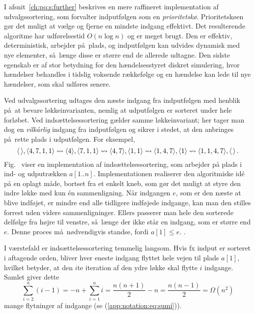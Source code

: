 I afsnit~\ref{ch:pq:s:further}
beskrives en mere raffineret implementation af udvalgssortering, som forvalter indputfølgen som en \emph{prioritetskø}.
Prioritetskøen gør det muligt at vælge og fjerne en mindste indgang effektivt.
Det resulterende algoritme har udførelsestid $O(n\log n)$ og er meget brugt.
Den er effektiv, deterministisk, arbejder på plads, og indputfølgen kan udvides dynamisk
med nye elementer, så længe disse er større end de allerede udtagne.
Den sidste egenskab er af stor betydning for den hændelsesstyret diskret simulering, hvor hændelser behandles i tidslig voksende rækkefølge og en hændelse kan lede til nye hændelser, som skal udføres senere.

Ved udvalgssortering udtages den næste indgang fra indputfølgen med henblik på at bevare løkkeinvarianten,
nemlig at udputfølgen er sorteret under hele forløbet.
Ved indsættelsessortering%
gælder samme løkkeinvariant;
her tager man dog en \emph{vilkårlig} indgang fra indputfølgen og sikrer i stedet, at den anbringes på rette plads i udputfølgen.
For eksempel,
\[
\langle \,\rangle,\langle 4,7,1,1\rangle\leadsto
\langle 4\rangle,\langle 7,1,1\rangle\leadsto
\langle 4,7\rangle,\langle 1,1\rangle\leadsto
\langle 1,4,7\rangle,\langle 1\rangle\leadsto
\langle 1,1,4,7\rangle,\langle \,\rangle\,. \]
Fig.~ viser en implementation af indsættelsessortering, som arbejder på plads i ind- og udputrækken $a[1..n]$. 
Implementationen realiserer den algoritmiske idé på en oplagt måde, bortset fra et enkelt kneb, som gør det muligt at styre den indre løkke med kun én sammenligning.
Når indgangen $e$, som er den næste at blive indføjet, er mindre end alle tidligere indføjede indgange, kan man den stilles forrest uden videre sammenligninger. 
Ellers passerer man hele den sorterede delfølge fra højre til venstre, så længe der ikke står en indgang, som er større end $e$.
Denne proces må nødvendigvis standse, fordi $a[1]\leq e$.
.   

I værstefald er indsættelsessortering temmelig langsom.
Hvis fx indput er sorteret i aftagende orden, bliver hver eneste indgang flyttet hele vejen til plads $a[1]$, hvilket betyder, at den $i$te iteration af den ydre løkke skal flytte $i$ indgange.
Samlet giver dette
\[\sum_{i=2}^n(i-1)=
  -n+\sum_{i=1}^ni=
  \frac{n(n+1)}{2}-n=
  \frac{n(n-1)}{2}=\Omega(n^2)\]
  mange flytninger af indgange (se (\ref{app:notation:eq:sumi})).

